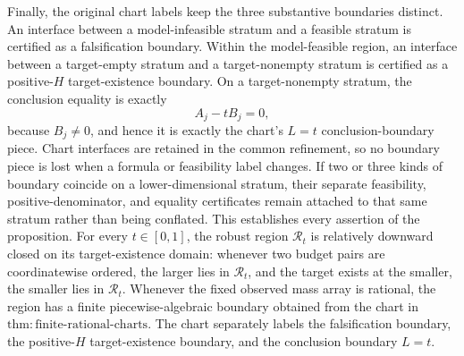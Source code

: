 Finally, the original chart labels keep the three substantive boundaries distinct.  An interface between a model-infeasible stratum and a feasible stratum is certified as a falsification boundary.  Within the model-feasible region, an interface between a target-empty stratum and a target-nonempty stratum is certified as a positive-\(H\) target-existence boundary.  On a target-nonempty stratum, the conclusion equality is exactly
\[
 A_j-tB_j=0,
\]
because \(B_j\neq0\), and hence it is exactly the chart's \(L=t\) conclusion-boundary piece.  Chart interfaces are retained in the common refinement, so no boundary piece is lost when a formula or feasibility label changes.  If two or three kinds of boundary coincide on a lower-dimensional stratum, their separate feasibility, positive-denominator, and equality certificates remain attached to that same stratum rather than being conflated.  This establishes every assertion of the proposition.
For every \(t\in[0,1]\), the robust region \(\mathcal R_t\) is relatively downward closed on its target-existence domain: whenever two budget pairs are coordinatewise ordered, the larger lies in \(\mathcal R_t\), and the target exists at the smaller, the smaller lies in \(\mathcal R_t\).  Whenever the fixed observed mass array is rational, the region has a finite piecewise-algebraic boundary obtained from the chart in \(\mathrm{thm:finite\text{-}rational\text{-}charts}\).  The chart separately labels the falsification boundary, the positive-\(H\) target-existence boundary, and the conclusion boundary \(L=t\).

